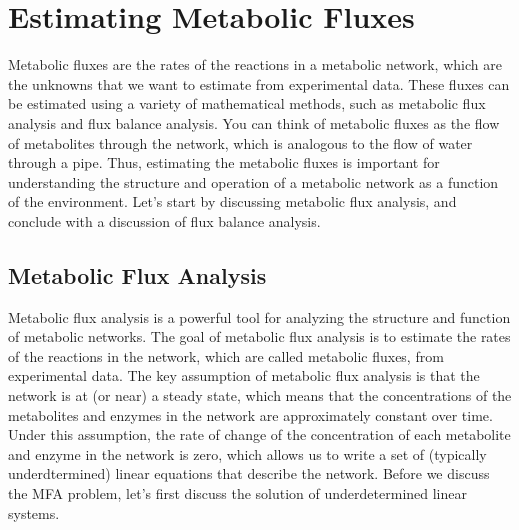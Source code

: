 \documentclass{article}[12pt]
\begin{document}
\section{Estimating Metabolic Fluxes}
Metabolic fluxes are the rates of the reactions in a metabolic network, which are the unknowns that we want to estimate from experimental data.
These fluxes can be estimated using a variety of mathematical methods, such as metabolic flux analysis and flux balance analysis.
You can think of metabolic fluxes as the flow of metabolites through the network, which is analogous to the flow of water through a pipe.
Thus, estimating the metabolic fluxes is important for understanding the structure and operation of a metabolic network as a function of the environment.
Let's start by discussing metabolic flux analysis, and conclude with a discussion of flux balance analysis.

\subsection{Metabolic Flux Analysis}
Metabolic flux analysis is a powerful tool for analyzing the structure and function of metabolic networks.
The goal of metabolic flux analysis is to estimate the rates of the reactions in the network, which are called metabolic fluxes, from experimental data.
The key assumption of metabolic flux analysis is that the network is at (or near) a steady state, which means that the concentrations of the metabolites and enzymes in the network are approximately constant over time.
Under this assumption, the rate of change of the concentration of each metabolite and enzyme in the network is zero, which allows us to write a set of (typically underdtermined) linear equations that describe the network.
Before we discuss the MFA problem, let's first discuss the solution of underdetermined linear systems.
\end{document}
